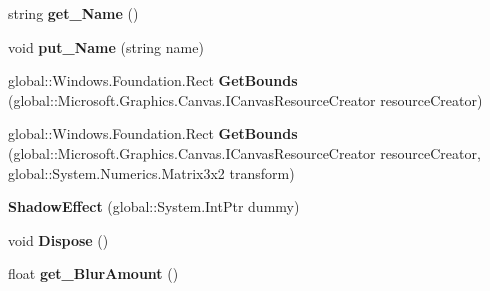 \begin{DoxyCompactItemize}
\item 
\mbox{\label{class_microsoft_1_1_graphics_1_1_canvas_1_1_effects_1_1_shadow_effect_ae75c5594a5505143330886ab97a00047}} 
string {\bfseries get\+\_\+\+Name} ()
\item 
\mbox{\label{class_microsoft_1_1_graphics_1_1_canvas_1_1_effects_1_1_shadow_effect_af2daadbe96b31c8535dd6d80f4fa8611}} 
void {\bfseries put\+\_\+\+Name} (string name)
\item 
\mbox{\label{class_microsoft_1_1_graphics_1_1_canvas_1_1_effects_1_1_shadow_effect_a74974b8df0482f01e4e4c8267d217afb}} 
global\+::\+Windows.\+Foundation.\+Rect {\bfseries Get\+Bounds} (global\+::\+Microsoft.\+Graphics.\+Canvas.\+I\+Canvas\+Resource\+Creator resource\+Creator)
\item 
\mbox{\label{class_microsoft_1_1_graphics_1_1_canvas_1_1_effects_1_1_shadow_effect_a9814bbd0429ff479d8ddd4998601c43d}} 
global\+::\+Windows.\+Foundation.\+Rect {\bfseries Get\+Bounds} (global\+::\+Microsoft.\+Graphics.\+Canvas.\+I\+Canvas\+Resource\+Creator resource\+Creator, global\+::\+System.\+Numerics.\+Matrix3x2 transform)
\item 
\mbox{\label{class_microsoft_1_1_graphics_1_1_canvas_1_1_effects_1_1_shadow_effect_a31ee829e7b76a3af6f36ea4b38c62c57}} 
{\bfseries Shadow\+Effect} (global\+::\+System.\+Int\+Ptr dummy)
\item 
\mbox{\label{class_microsoft_1_1_graphics_1_1_canvas_1_1_effects_1_1_shadow_effect_a73406e739d302a61cfd5aefe0433a499}} 
void {\bfseries Dispose} ()
\item 
\mbox{\label{class_microsoft_1_1_graphics_1_1_canvas_1_1_effects_1_1_shadow_effect_a68acc2d1a4491bb3ca7736b7a083a90c}} 
float {\bfseries get\+\_\+\+Blur\+Amount} ()
\item 

\end{DoxyCompactItemize}
